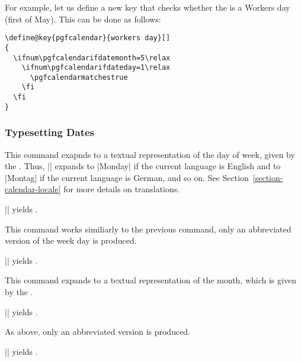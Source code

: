 \begin{command}{\pgfcalendarifdate{}}
  For example, let us define a new key that checks whether the
   is a Workers day (first of May). This can be done as
  follows:
\begin{verbatim}
\define@key{pgfcalendar}{workers day}[]
{
  \ifnum\pgfcalendarifdatemonth=5\relax
    \ifnum\pgfcalendarifdateday=1\relax
      \pgfcalendarmatchestrue
    \fi
  \fi
}
\end{verbatim}
\end{command}


\subsubsection{Typesetting Dates}

\begin{command}{\pgfcalendarweekdayname{}}
  This command exapnds to a textual representation of the day of week,
  given by the . Thus,
  || expands to |Monday| if the current
  language is English and to |Montag| if the current language is
  German, and so on. See Section~\ref{section-calendar-locale} for
  more details on translations.

  \example || yields
  \texttt{}. 
\end{command}


\begin{command}{\pgfcalendarweekdayshortname{}}
  This command works similiarly to the previous command, only an
  abbreviated version of the week day is produced.

  \example || yields
  \texttt{}. 
\end{command}


\begin{command}{\pgfcalendarmonthname{}}
  This command expands to a textual representation of the month, which
  is given by the .

  \example || yields
  \texttt{}. 
\end{command}


\begin{command}{\pgfcalendarmonthshortname{}}
  As above, only an abbreviated version is produced.

  \example || yields
  \texttt{}.   
\end{command}

